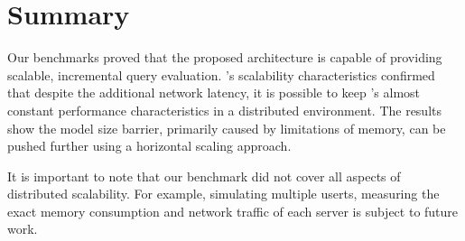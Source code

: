 

\section{Summary}

Our benchmarks proved that the proposed architecture is capable of providing scalable, incremental query evaluation.
\iqd{}'s scalability characteristics confirmed that despite the additional network latency, it is possible to keep \eiq{}'s almost constant performance characteristics in a distributed environment. The results show the model size barrier, primarily caused by limitations of memory, 
can be pushed further using a horizontal scaling approach.

It is important to note that our benchmark did not cover all aspects of distributed scalability. For example, simulating multiple userts, measuring the exact memory consumption and network traffic of each server is subject to future work.


